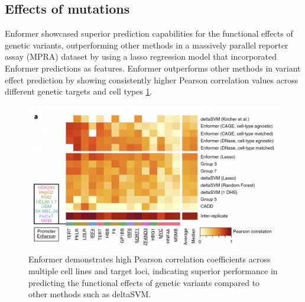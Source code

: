 \documentclass[final,5p,times,twocolumn]{elsarticle}
\begin{document}
\subsection{Effects of mutations}
Enformer showcased superior prediction capabilities for the functional effects of genetic variants, outperforming other methods in a massively parallel reporter assay (MPRA) dataset by using a lasso regression model that incorporated Enformer predictions as features. Enformer outperforms other methods in variant effect prediction by showing consistently higher Pearson correlation values across different genetic targets and cell types \ref{fig:mutations}.

\begin{figure}[ht]
    \centering
    \includegraphics[width=\linewidth]{img/mutations2.png}
    \caption{Enformer demonstrates high Pearson correlation coefficients across multiple cell lines and target loci, indicating superior performance in predicting the functional effects of genetic variants compared to other methods such as deltaSVM.}\label{fig:mutations}
\end{figure}



 

\end{document}
